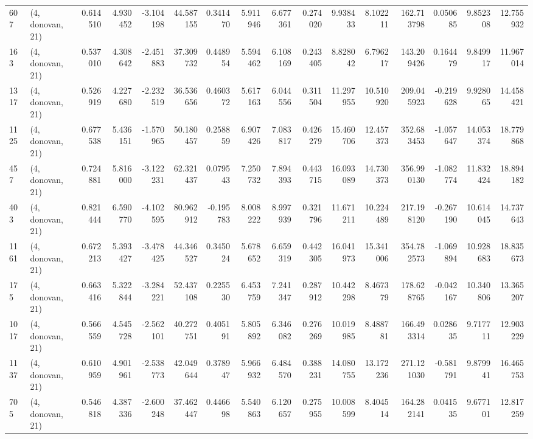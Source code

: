 \begin{tabular}{llrrrrrrrrrrrrrr}
607  &  (4, donovan, 21) &   0.614510 &   4.930452 &  -3.104198 &     44.587155 &    0.341470 &    5.911946 &    6.677361 &  0.274020 &   9.938433 &   8.102211 &   162.713798 &   0.050685 &   9.852308 &  12.755932 \\
163  &  (4, donovan, 21) &   0.537010 &   4.308642 &  -2.451883 &     37.309732 &    0.448954 &    5.594462 &    6.108169 &  0.243405 &   8.828042 &   6.796217 &   143.209426 &   0.164479 &   9.849917 &  11.967014 \\
1317 &  (4, donovan, 21) &   0.526919 &   4.227680 &  -2.232519 &     36.536656 &    0.460372 &    5.617163 &    6.044556 &  0.311504 &  11.297955 &  10.510920 &   209.045923 &  -0.219628 &   9.928065 &  14.458421 \\
1125 &  (4, donovan, 21) &   0.677538 &   5.436151 &  -1.570965 &     50.180457 &    0.258859 &    6.907426 &    7.083817 &  0.426279 &  15.460706 &  12.457373 &   352.683453 &  -1.057647 &  14.053374 &  18.779868 \\
457  &  (4, donovan, 21) &   0.724881 &   5.816000 &  -3.122231 &     62.321437 &    0.079543 &    7.250732 &    7.894393 &  0.443715 &  16.093089 &  14.730373 &   356.990130 &  -1.082774 &  11.832424 &  18.894182 \\
403  &  (4, donovan, 21) &   0.821444 &   6.590770 &  -4.102595 &     80.962912 &   -0.195783 &    8.008222 &    8.997939 &  0.321796 &  11.671211 &  10.224489 &   217.198120 &  -0.267190 &  10.614045 &  14.737643 \\
1161 &  (4, donovan, 21) &   0.672213 &   5.393427 &  -3.478425 &     44.346527 &    0.345024 &    5.678652 &    6.659319 &  0.442305 &  16.041973 &  15.341006 &   354.782573 &  -1.069894 &  10.928683 &  18.835673 \\
175  &  (4, donovan, 21) &   0.663416 &   5.322844 &  -3.284221 &     52.437108 &    0.225530 &    6.453759 &    7.241347 &  0.287912 &  10.442298 &   8.467379 &   178.628765 &  -0.042167 &  10.340806 &  13.365207 \\
1017 &  (4, donovan, 21) &   0.566559 &   4.545728 &  -2.562101 &     40.272751 &    0.405191 &    5.805892 &    6.346082 &  0.276269 &  10.019985 &   8.488781 &   166.493314 &   0.028635 &   9.717711 &  12.903229 \\
1137 &  (4, donovan, 21) &   0.610959 &   4.901961 &  -2.538773 &     42.049644 &    0.378947 &    5.966932 &    6.484570 &  0.388231 &  14.080755 &  13.172236 &   271.121030 &  -0.581791 &   9.879941 &  16.465753 \\
705  &  (4, donovan, 21) &   0.546818 &   4.387336 &  -2.600248 &     37.462447 &    0.446698 &    5.540863 &    6.120657 &  0.275955 &  10.008599 &   8.404514 &   164.282141 &   0.041535 &   9.677101 &  12.817259 \\

\end{tabular}
